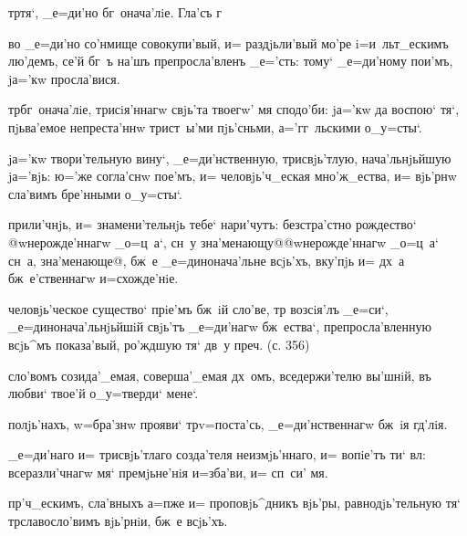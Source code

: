 
тр тя`, _е=ди'но бг~онача'лiе. %
Гла'съ г~%


во _е=ди'но со'нмище совокупи'вый, и= раздjьли'вый мо'ре 
i=и~льт_ескимъ лю'демъ, се'й бг~ъ на'шъ препросла'вленъ 
_е='сть: тому` _е=ди'ному пои'мъ, jа='кw просла'вися.

тр бг~онача'лiе, трисiя'ннагw свjь'та твоегw' мя 
сподо'би: jа='кw да воспою` тя`, пjьва'емое непреста'ннw 
трист~ы'ми пjь'сньми, а='гг~льскими о_у=сты`.

jа='кw твори'тельную вину`, _е=ди'нственную, 
трисвjь'тлую, нача'льнjьйшую jа='вjь: ю='же согла'снw 
пое'мъ, и= человjь'ч_еская мно'ж_ества, и= вjь'рнw 
сла'вимъ бре'нными о_у=сты`.

прили'чнjь, и= знамени'тельнjь тебе` нари'чутъ: 
безстра'стно рождество` @w\т нерожде'ннагw _о=ц~а`, сн~у 
зна'менающу@{@w\т нерожде'ннагw _о=ц~а` сн~а, 
зна'менающе@}, бж~е _е=динонача'льне всjь'хъ, вку'пjь и= 
дх~а бж~е'ственнагw и=схожде'нiе.

человjь'ческое существо` прiе'мъ бж~iй сло'ве, тр 
возсiя'лъ _е=си`, _е=динонача'льнjьйшiй свjь'тъ 
_е=ди'нагw бж~ества`, препросла'вленную всjь^мъ 
показа'вый, ро'ждшую тя` дв~у преч. (с. 356)


сло'вомъ созида'_емая, соверша'_емая дх~омъ, 
вседержи'телю вы'шнiй, въ любви` твое'й о_у=тверди` 
мене`.

полjь'нахъ, w=бра'знw прояви` тр v=поста'сь, 
_е=ди'нственнагw бж~iя гд'лiя.

_е=ди'наго и= трисвjь'тлаго созда'теля неизмjь'ннаго, и= 
вопiе'тъ ти` вл: всеразли'чнагw мя` премjьне'нiя 
и=зба'ви, и= сп~си' мя.

пр'ч_ескимъ, сла'вныхъ а=п же и= проповjь^дникъ 
вjь'ры, равнодjь'тельную тя` тр славосло'вимъ 
вjь'рнiи, бж~е всjь'хъ.

